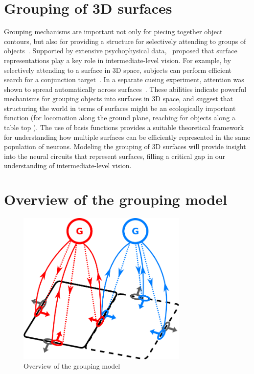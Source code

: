 \section{Grouping of 3D surfaces}
Grouping mechanisms are important not only for piecing together object contours, but also for providing a structure for selectively attending
to groups of objects~\citep{Treisman_Gelade80}. Supported by extensive psychophysical data,~\citet*{Nakayama_etal95} proposed that surface
representations play a key role in intermediate-level vision. For example, by selectively attending to a surface in 3D space, subjects can perform efficient search for a conjunction target~\citep{Nakayama_Silverman86}. In a separate cueing experiment, attention was shown to spread automatically across surfaces~\citep{He_Nakayama95}. These abilities indicate powerful mechanisms for grouping objects into surfaces in 3D space, and suggest that structuring the world in terms of surfaces might be an ecologically important function (\eg for locomotion along the ground
plane, reaching for objects along a table top \etc). The use of basis functions provides a suitable theoretical framework for understanding how multiple surfaces can be efficiently represented in the same population of neurons. Modeling the grouping of 3D surfaces will provide insight into the neural circuits that represent surfaces, filling a critical gap in our understanding of intermediate-level vision.

\section{Overview of the grouping model}
\begin{figure}[t]
\centering
\includegraphics[width=0.75\textwidth]{Intro/figs/groupingcircuit}
\makeatletter
\let\@currsize\normalsize
\caption{Overview of the grouping model}
\label{fig:GroupingModel}
\end{figure}

